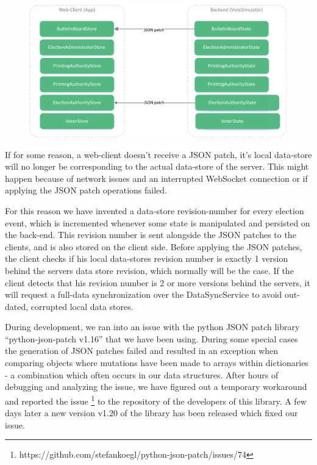 \begin{figure}
\begin{center}
\includegraphics[scale=0.62]{assets/DatastoresJsonPatch.pdf}
\label{Data-Sync with JSON Patches}%
\end{center}
\end{figure}

If for some reason, a web-client doesn't receive a JSON patch, it's local data-store will no longer be corresponding to the actual data-store of the server. This might happen because of network issues and an interrupted WebSocket connection or if applying the JSON patch operations failed.

For this reason we have invented a data-store revision-number for every election event, which is incremented whenever some state is manipulated and persisted on the back-end. This revision number is sent alongside the JSON patches to the clients, and is also stored on the client side. Before applying the JSON patches, the client checks if his local data-stores revision number is exactly 1 version behind the servers data store revision, which normally will be the case. If the client detects that his revision number is 2 or more versions behind the servers, it will request a full-data synchronization over the DataSyncService to avoid out-dated, corrupted local data stores.

During development, we ran into an issue with the python JSON patch library "`python-json-patch v1.16"' that we have been using. During some special cases the generation of JSON patches failed and resulted in an exception when comparing objects where mutations have been made to arrays within dictionaries - a combination which often occurs in our data structures. After hours of debugging and analyzing the issue, we have figured out a temporary workaround and reported the issue \footnote{https://github.com/stefankoegl/python-json-patch/issues/74} to the repository of the developers of this library. A few days later a new version v1.20 of the library has been released which fixed our issue.

